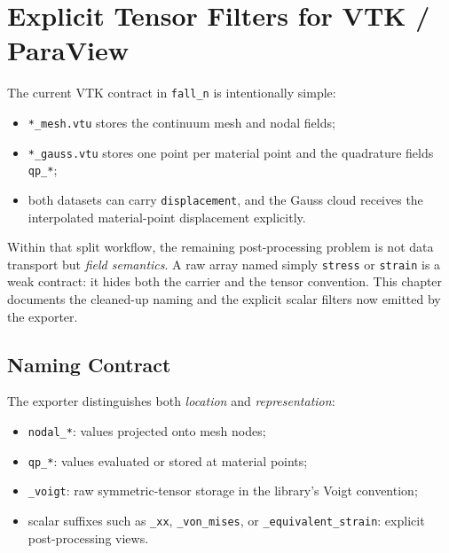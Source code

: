 
\chapter{Explicit Tensor Filters for VTK / ParaView}
\label{ch:vtk_tensor_filters}

The current VTK contract in \texttt{fall\_n} is intentionally simple:
\begin{itemize}[nosep]
  \item \texttt{*\_mesh.vtu} stores the continuum mesh and nodal fields;
  \item \texttt{*\_gauss.vtu} stores one point per material point and the
        quadrature fields \texttt{qp\_*};
  \item both datasets can carry \texttt{displacement}, and the Gauss cloud
        receives the interpolated material-point displacement explicitly.
\end{itemize}

Within that split workflow, the remaining post-processing problem is not data
transport but \emph{field semantics}.  A raw array named simply
\texttt{stress} or \texttt{strain} is a weak contract: it hides both the
carrier and the tensor convention.  This chapter documents the cleaned-up
naming and the explicit scalar filters now emitted by the exporter.


\section{Naming Contract}
\label{sec:vtk_tensor_filters_naming}

The exporter distinguishes both \emph{location} and \emph{representation}:
\begin{itemize}[nosep]
  \item \texttt{nodal\_*}: values projected onto mesh nodes;
  \item \texttt{qp\_*}: values evaluated or stored at material points;
  \item \texttt{\_voigt}: raw symmetric-tensor storage in the library's Voigt
        convention;
  \item scalar suffixes such as \texttt{\_xx}, \texttt{\_von\_mises}, or
        \texttt{\_equivalent\_strain}: explicit post-processing views.
\end{itemize}

